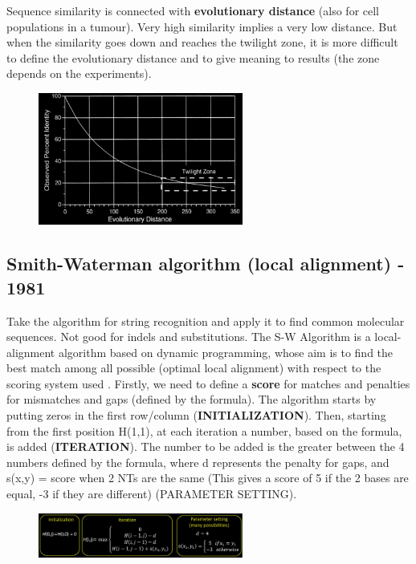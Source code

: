 Sequence similarity is connected with \textbf{evolutionary distance} (also for cell populations in a tumour). Very high similarity implies a very low distance. But when the similarity goes down and reaches the twilight zone, it is more difficult to define the evolutionary distance and to give meaning to results (the zone depends on the experiments).

\begin{figure}[h]
\centering
\includegraphics[width=0.6\textwidth]{EvolutionaryDistance.png}
\caption{}
\end{figure}

\subsection{Smith-Waterman algorithm  (local alignment) - 1981}

Take the algorithm for string recognition and apply it to find common molecular sequences. Not good for indels and substitutions. 
The S-W Algorithm is a local-alignment algorithm based on dynamic programming, whose aim is to find the best match among all possible (optimal local alignment) with respect to the scoring system used .
Firstly, we need to define a \textbf{score} for matches and penalties for mismatches and gaps (defined by the formula). 
The algorithm starts by putting zeros in the first row/column (\textbf{INITIALIZATION}). Then, starting from the first position H(1,1), at each iteration a number, based on the formula, is added (\textbf{ITERATION}). The number to be added is the greater between the 4 numbers defined by the formula, where d represents the penalty for gaps, and  s(x,y) = score when 2 NTs are the same (This gives a score of 5 if the 2 bases are equal, -3 if they are different) (PARAMETER SETTING).

\begin{figure}[h]
\centering
\includegraphics[width=0.6\textwidth]{Waterman.png}
\caption{}
\end{figure}

